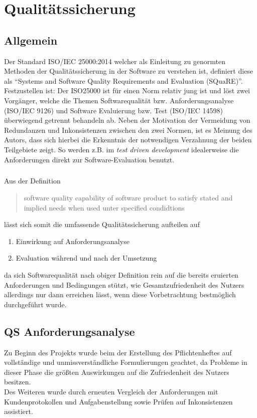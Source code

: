 \chapter{Qualitätssicherung}
\label{QS}
\section{Allgemein} \label{QS:Allgemein}
Der Standard ISO/IEC 25000:2014 welcher als Einleitung zu genormten Methoden der Qualitätssicherung in der Software zu verstehen ist, definiert diese als "`Systems and Software Quality Requirements and Evaluation (SQuaRE)"'\cite[Foreword]{ISO25000:2014}. Festzustellen ist: Der ISO25000 ist für einen Norm relativ jung ist und löst zwei Vorgänger, welche die Themen Softwarequalität bzw. Anforderungsanalyse (ISO/IEC 9126) und Software Evaluierung bzw. Test (ISO/IEC 14598) überwiegend getrennt behandeln ab. Neben der Motivation der Vermeidung von Redundanzen und Inkonsistenzen zwischen den zwei Normen, ist es Meinung des Autors, dass sich hierbei die Erkenntnis der notwendigen Verzahnung der beiden Teilgebiete zeigt. So werden z.B. im \textit{test driven development} idealerweise die Anforderungen direkt zur Software-Evaluation benutzt.

\paragraph*{}Aus der Definition
\begin{quote}\label{PD_SQ}
software quality
capability of software product to satisfy stated and implied needs when used unter specified condidtions \cite[4 Terms and definitions]{ISO25000:2014}
\end{quote}
lässt sich somit die umfassende Qualitätssicherung aufteilen auf
\begin{enumerate}
\item Einwirkung auf Anforderungsanalyse
\item Evaluation während und nach der Umsetzung
\end{enumerate}
da sich Softwarequalität nach obiger Definition rein auf die bereits eruierten Anforderungen und Bedingungen stützt, wie Gesamtzufriedenheit des Nutzers allerdings nur dann erreichen lässt, wenn diese Vorbetrachtung bestmöglich durchgeführt wurde.
\section{QS Anforderungsanalyse}
Zu Beginn des Projekts wurde beim der Erstellung des Pflichtenheftes auf vollständige und unmissverständliche Formulierungen geachtet, da Probleme in dieser Phase die größten Auswirkungen auf die Zufriedenheit des Nutzers besitzen.\\
Des Weiteren wurde durch erneuten Vergleich der Anforderungen mit Kundenprotokollen und Aufgabenstellung sowie Prüfen auf Inkonsistenzen assistiert.

